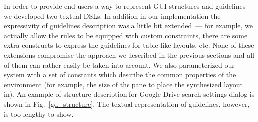 In order to provide end-users a way to represent GUI structures and guidelines we developed two textual DSLs. In addition in our implementation
the expressivity of guidelines description was a little bit extended~--- for example, we actually allow the rules to be equipped with custom constraints, there are
some extra constructs to express the guidelines for table-like layouts, etc. None of these extensions compromise the approach we
described in the previous sections and all of them can rather easily be taken into account. We also parameterized our system with
a set of constants which describe the common properties of the environment (for example, the size of the pane to place the synthesized layout in).
An example of structure description for Google Drive search settings dialog is shown in Fig.~\ref{gd_structure}.
The textual representation of guidelines, however, is too lengthy to show.


